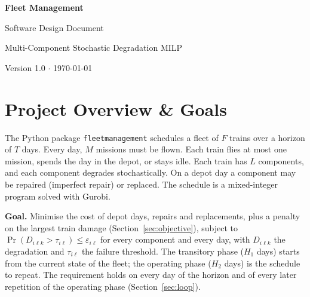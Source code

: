 \documentclass[11pt,a4paper]{article}
\theoremstyle{plain}
\theoremstyle{definition}
\renewcommand{\_}{\textunderscore\allowbreak{}}
\begin{document}
\hypersetup{pageanchor=false}
\begin{titlepage}
  \centering
  \vspace*{3cm}
  {\Huge\bfseries Fleet Management\par}
  \vspace{0.5cm}
  {\Large Software Design Document\par}
  \vspace{0.3cm}
  {\large Multi-Component Stochastic Degradation MILP\par}
  \vspace{1cm}
  {\large Version 1.0 $\cdot$ \today\par}
\end{titlepage}
\hypersetup{pageanchor=true}

\tableofcontents
\newpage

\section{Project Overview \& Goals}
\label{sec:overview}

The Python package \texttt{fleet\_management} schedules a fleet of $F$ trains over a
horizon of $T$ days. Every day, $M$ missions must be flown. Each train flies at most
one mission, spends the day in the depot, or stays idle. Each train has $L$
components, and each component degrades stochastically. On a depot day a component
may be repaired (imperfect repair) or replaced. The schedule is a mixed-integer
program solved with Gurobi.

\textbf{Goal.} Minimise the cost of depot days, repairs and replacements, plus a
penalty on the largest train damage (Section~\ref{sec:objective}), subject to
$\Pr(D_{i\ell k} > \tau_{i\ell}) \leq \varepsilon_{i\ell}$ for every component and
every day, with $D_{i\ell k}$ the degradation and $\tau_{i\ell}$ the failure
threshold. The transitory phase ($H_1$ days) starts from the current state of the
fleet; the operating phase ($H_2$ days) is the schedule to repeat. The requirement
holds on every day of the horizon and of every later repetition of the operating
phase (Section~\ref{sec:loop}).
\end{document}

